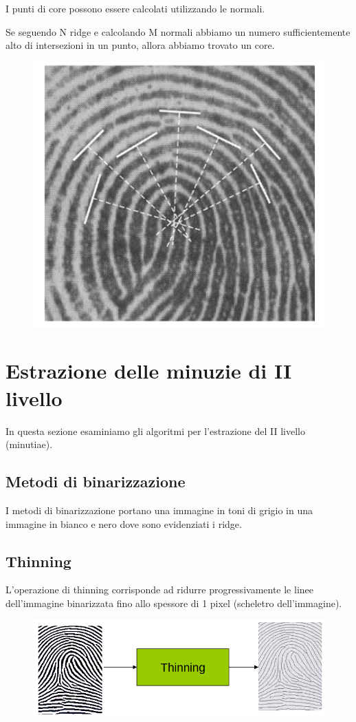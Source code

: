 \documentclass{report}
\begin{document}
I punti di core possono essere calcolati utilizzando le normali.

\noindent Se seguendo N ridge e calcolando M normali abbiamo un numero sufficientemente
alto di intersezioni in un punto, allora abbiamo trovato un core.

\begin{figure}[ht]
    \centering
    \includegraphics[width=0.5\linewidth]{images/core-detection.png}
\end{figure}

\section{Estrazione delle minuzie di II livello}

In questa sezione esaminiamo gli algoritmi per l'estrazione del II livello (minutiae).

\subsection{Metodi di binarizzazione}

I metodi di binarizzazione portano una immagine in toni di
grigio in una immagine in bianco e nero dove sono
evidenziati i ridge.

\subsection{Thinning}

L’operazione di thinning corrisponde ad ridurre
progressivamente le linee dell’immagine
binarizzata fino allo spessore di 1 pixel (scheletro
dell’immagine).

\begin{figure}[ht]
    \centering
    \includegraphics[width=0.75\linewidth]{images/thinning.png}
\end{figure}
\end{document}
